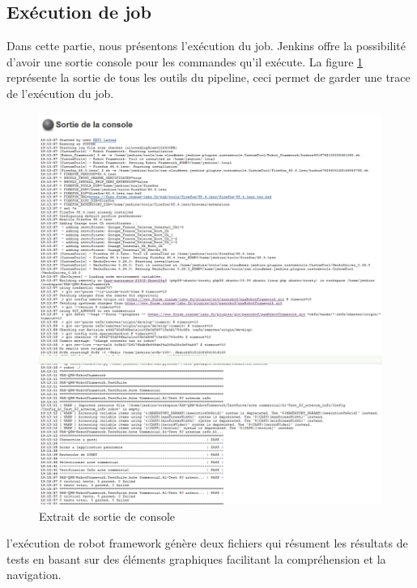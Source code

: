 \subsection{Exécution de job}
Dans cette partie, nous présentons l’exécution du job. Jenkins offre la possibilité d’avoir une sortie console pour les commandes qu’il exécute.\newpage
La figure \ref{fig:exemple-console} représente la sortie de tous les outils du pipeline, ceci permet de garder une trace de l’exécution du job.
\begin{figure}[H]
	\centering
	\includegraphics[width=1.1\linewidth]{"img/jenkins/exemple console"}
	\caption[Extrait de sortie de console]{Extrait de sortie de console}
	\label{fig:exemple-console}
\end{figure}
l’exécution de robot framework génère deux fichiers qui résument les résultats de tests en basant sur des éléments graphiques facilitant la compréhension et la navigation.
